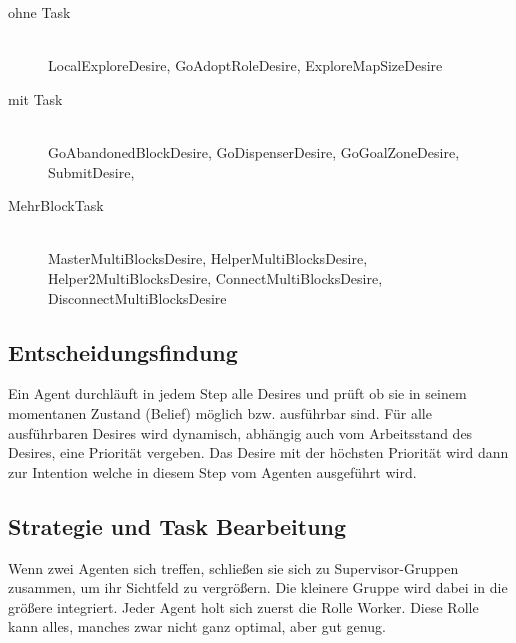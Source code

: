 \documentclass[runningheads]{llncs}
\begin{document}
\begin{description}
	\item[ohne Task]\hfill \\
	LocalExploreDesire,
	GoAdoptRoleDesire, 
	ExploreMapSizeDesire
\end{description}

\begin{description}
	\item[mit Task]\hfill \\
	GoAbandonedBlockDesire,
	GoDispenserDesire,
	GoGoalZoneDesire,
	SubmitDesire,
\end{description}

\begin{description}
	\item[Mehr\-Block\-Task]\hfill \\
	MasterMultiBlocksDesire,
	HelperMultiBlocksDesire,
	Helper2MultiBlocksDesire,
	ConnectMultiBlocksDesire,
	DisconnectMultiBlocksDesire
\end{description}

\subsection{Entscheidungsfindung}
Ein Agent durchläuft in jedem Step alle Desires und prüft ob sie in seinem momentanen Zustand (Belief) möglich bzw. ausführbar sind. Für alle ausführbaren Desires wird dynamisch, abhängig auch vom Arbeitsstand des Desires, eine Priorität vergeben. Das Desire mit der höchsten Priorität wird dann zur Intention welche in diesem Step vom Agenten ausgeführt wird.

\subsection{Strategie und Task Bearbeitung}
Wenn zwei Agenten sich treffen, schließen sie sich zu Supervisor-Gruppen zusammen, um ihr Sichtfeld zu vergrößern. Die kleinere Gruppe wird dabei in die größere integriert. Jeder Agent holt sich zuerst die Rolle Worker. Diese Rolle kann alles, manches zwar nicht ganz optimal, aber gut genug.\\
\end{document}
